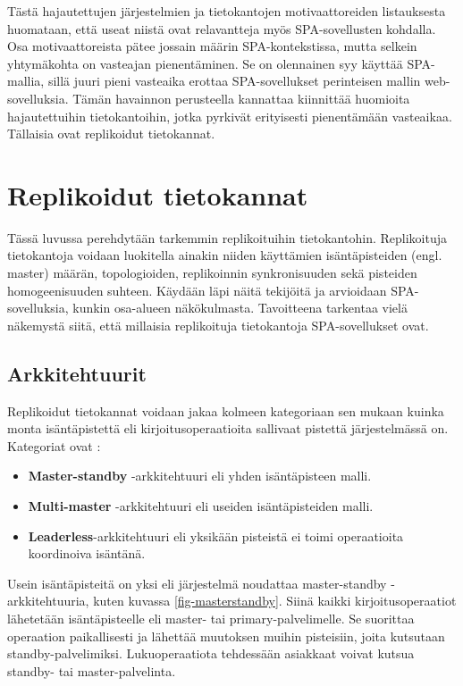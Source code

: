 \documentclass[finnish,twoside,censored,csm,sw-track-2018]{HYthesisML}
\begin{document}
Tästä hajautettujen järjestelmien ja tietokantojen motivaattoreiden listauksesta huomataan, että useat niistä ovat relavantteja myös SPA-sovellusten kohdalla. Osa motivaattoreista pätee jossain määrin SPA-kontekstissa, mutta selkein yhtymäkohta on vasteajan pienentäminen. Se on olennainen syy käyttää SPA-mallia, sillä juuri pieni vasteaika erottaa SPA-sovellukset perinteisen mallin web-sovelluksia. Tämän havainnon perusteella kannattaa kiinnittää huomioita hajautettuihin tietokantoihin, jotka pyrkivät erityisesti pienentämään vasteaikaa. Tällaisia ovat replikoidut tietokannat. 

\chapter{Replikoidut tietokannat}
\label{sec-arkkitehtuurit-teoria}

Tässä luvussa perehdytään tarkemmin replikoituihin tietokantohin. Replikoituja tietokantoja voidaan luokitella ainakin niiden käyttämien isäntäpisteiden (engl. master) määrän, topologioiden, replikoinnin synkronisuuden sekä pisteiden homogeenisuuden suhteen. Käy\-dään läpi näitä tekijöitä ja arvioidaan SPA-sovelluksia, kunkin osa-alueen näkökulmasta. Tavoitteena tarkentaa vielä näkemystä siitä, että millaisia replikoituja tietokantoja SPA-sovellukset ovat.

\section{Arkkitehtuurit}

Replikoidut tietokannat voidaan jakaa kolmeen kategoriaan sen mukaan kuinka monta isäntäpistettä eli kirjoitusoperaatioita sallivaat pistettä järjestelmässä on. Kategoriat ovat \citep{Kleppmann}:

\begin{itemize}[topsep=2pt,itemsep=1pt]
    \item \textbf{Master-standby} -arkkitehtuuri eli yhden isäntäpisteen malli.
    \item \textbf{Multi-master} -arkkitehtuuri eli useiden isäntäpisteiden malli.
    \item \textbf{Leaderless}-arkkitehtuuri eli yksikään pisteistä ei toimi operaatioita koordinoiva isäntänä.
\end{itemize}

Usein isäntäpisteitä on yksi eli järjestelmä noudattaa master-standby -arkkitehtuuria, kuten kuvassa \ref{fig-masterstandby}\citep{Kleppmann}. Siinä kaikki kirjoitusoperaatiot lähetetään isäntäpisteelle eli master- tai primary-palvelimelle. Se suorittaa operaation paikallisesti ja lähettää muutoksen muihin pisteisiin, joita kutsutaan standby-palvelimiksi. Lukuoperaatiota tehdessään asiakkaat voivat kutsua standby- tai master-palvelinta.
\end{document}
